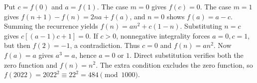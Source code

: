 Put $ c=f(0)$ and $ a=f(1)$. The case $ m=0 $ gives $ f(c)=0 $. The case $ m=1 $ gives $ f(n+1)-f(n)=2na+f(a)$, and $ n=0 $ shows $ f(a)=a-c $. Summing the recurrence yields $ f(n)=an^2+c(1-n)$. Substituting $ n=c $ gives $ c[(a-1)c+1]=0 $. If $ c>0 $, nonnegative integrality forces $ a=0,c=1 $, but then $ f(2)=-1 $, a contradiction. Thus $ c=0 $ and $ f(n)=an^2 $. Now $ f(a)=a $ gives $ a^3=a $, hence $ a=0 $ or $ 1 $. Direct substitution verifies both the zero function and $ f(n)=n^2 $. The extra condition excludes the zero function, so $ f(2022)=2022^2\equiv22^2=\boxed{484}\pmod{1000}$.
